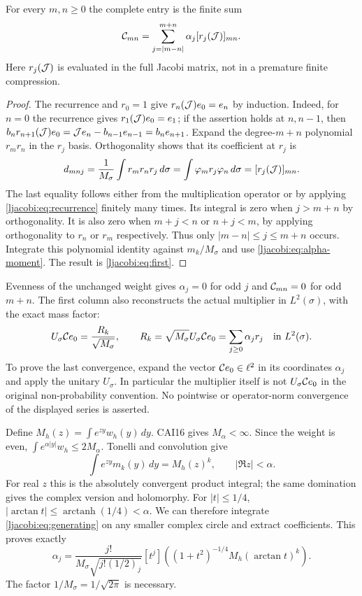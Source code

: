 \begin{ljacobitheorem}\label{ljacobi:thm:first}
For every $m,n\geq0$ the complete entry is the finite sum
\begin{equation}\label{ljacobi:eq:first}
 \mathcal C_{mn}=\sum_{j=|m-n|}^{m+n}\alpha_j[r_j(\mathcal J)]_{mn}.
\end{equation}
Here $r_j(\mathcal J)$ is evaluated in the full Jacobi matrix, not in a
premature finite compression.
\end{ljacobitheorem}
\begin{proof}
The recurrence and $r_0=1$ give $r_n(\mathcal J)e_0=e_n$ by induction.
Indeed, for $n=0$ the recurrence gives $r_1(\mathcal J)e_0=e_1$; if the
assertion holds at $n,n-1$, then
$b_n r_{n+1}(\mathcal J)e_0=\mathcal J e_n-b_{n-1}e_{n-1}=b_ne_{n+1}$.
Expand the degree-$m+n$ polynomial $r_mr_n$ in the $r_j$ basis.
Orthogonality shows that its coefficient at $r_j$ is
\[
 d_{mnj}=\frac1{M_\sigma}\int r_mr_nr_j\,d\sigma
       =\int\varphi_m r_j\varphi_n\,d\sigma
       =[r_j(\mathcal J)]_{mn}.
\]
The last equality follows either from the multiplication operator
or by applying \eqref{ljacobi:eq:recurrence} finitely many times. Its
integral is zero when $j>m+n$ by orthogonality. It is also zero
when $m+j<n$ or $n+j<m$, by applying orthogonality to $r_n$ or
$r_m$ respectively. Thus only $|m-n|\leq j\leq m+n$ occurs.
Integrate this polynomial identity against $m_k/M_\sigma$ and
use \eqref{ljacobi:eq:alpha-moment}. The result is \eqref{ljacobi:eq:first}.
\end{proof}

Evenness of the unchanged weight gives $\alpha_j=0$ for odd $j$ and
$\mathcal C_{mn}=0$ for odd $m+n$. The first column also reconstructs the
actual multiplier in $L^2(\sigma)$, with the exact mass factor:
\begin{equation}\label{ljacobi:eq:mass-caveat}
 U_\sigma\mathcal C e_0=\frac{R_k}{\sqrt{M_\sigma}},\qquad
 R_k=\sqrt{M_\sigma}U_\sigma\mathcal C e_0
       =\sum_{j\geq0}\alpha_jr_j\quad\text{in }L^2(\sigma).
\end{equation}
To prove the last convergence, expand the vector $\mathcal C e_0\in\ell^2$
in its coordinates $\alpha_j$ and apply the unitary $U_\sigma$.
In particular the multiplier itself is not $U_\sigma\mathcal C e_0$ in
the original non-probability convention. No pointwise or
operator-norm convergence of the displayed series is asserted.

Define $M_h(z)=\int e^{zy}w_h(y)\,dy$. CAI16 gives
$M_\alpha<\infty$. Since the weight is even,
$\int e^{\alpha|y|}w_h\leq2M_\alpha$. Tonelli and convolution give
\[
 \int e^{zy}m_k(y)\,dy=M_h(z)^k,
 \qquad |\Re z|<\alpha.
\]
For real $z$ this is the absolutely convergent product integral;
the same domination gives the complex version and holomorphy.
For $|t|\leq1/4$,
$|\arctan t|\leq\operatorname{arctanh}(1/4)<\alpha$.
We can therefore integrate \eqref{ljacobi:eq:generating} on any smaller
complex circle and extract coefficients. This proves exactly
\begin{equation}\label{ljacobi:eq:alpha-generating}
 \boxed{\alpha_j=
 \frac{j!}{M_\sigma\sqrt{j!(1/2)_j}}
 [t^j]\left((1+t^2)^{-1/4}M_h(\arctan t)^k\right).}
\end{equation}
The factor $1/M_\sigma=1/\sqrt{2\pi}$ is necessary.

